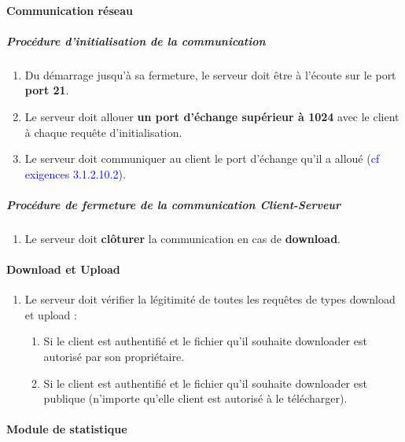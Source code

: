 \documentclass[10pt,a4paper]{report}
\begin{document}
\paragraph{Communication réseau}

	\subparagraph{Procédure d'initialisation de la communication}

		\begin{enumerate}
			\item  Du démarrage jusqu'à sa fermeture, le serveur doit être à l'écoute sur le port \textbf{port 21}.

			\item Le serveur doit allouer \textbf{un port d'échange supérieur à 1024} avec le client à chaque requête d'initialisation.

			\item Le serveur doit communiquer au client le port d'échange qu'il a alloué (\textcolor{blue}{cf exigences 3.1.2.10.2}).

		\end{enumerate}
		
\subparagraph{Procédure de fermeture de la communication Client-Serveur}

	\begin{enumerate}
		\item Le serveur doit \textbf{clôturer} la communication en cas de \textbf{download}. 
	\end{enumerate}

\paragraph{Download et Upload}
	
	\begin{enumerate}
		\item Le serveur doit vérifier la légitimité de toutes les requêtes de types download et upload :
		\begin{enumerate}
			\item Si le client est authentifié et le fichier qu'il souhaite downloader est autorisé par son propriétaire.
			\item Si le client est authentifié et le fichier qu'il souhaite downloader est publique (n'importe qu'elle client est autorisé à le télécharger).
		\end{enumerate}
	\end{enumerate}
	
\paragraph{Module de statistique \\ \\}
\end{document}
